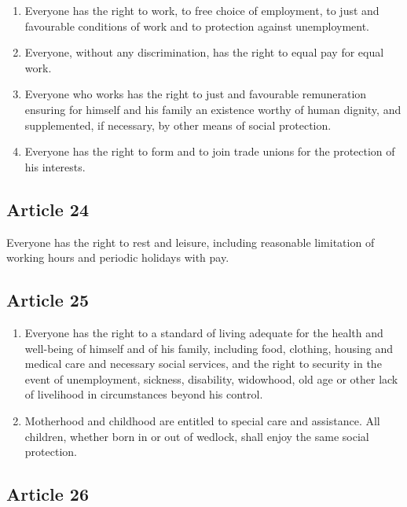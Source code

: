 \documentclass[
  ngerman,
  american,
  titlepage,
  openright,
  DIV=calc,
  toc=listof,
  listof=nochaptergap]{scrbook}
\begin{document}
\begin{enumerate}
\def\labelenumi{\arabic{enumi}.}
\item
  Everyone has the right to work, to free choice of employment, to just
  and favourable conditions of work and to protection against
  unemployment.
\item
  Everyone, without any discrimination, has the right to equal pay for
  equal work.
\item
  Everyone who works has the right to just and favourable remuneration
  ensuring for himself and his family an existence worthy of human
  dignity, and supplemented, if necessary, by other means of social
  protection.
\item
  Everyone has the right to form and to join trade unions for the
  protection of his interests.
\end{enumerate}

\subsection{Article 24}\label{article-24-4}

Everyone has the right to rest and leisure, including reasonable
limitation of working hours and periodic holidays with pay.

\subsection{Article 25}\label{article-25-4}

\begin{enumerate}
\def\labelenumi{\arabic{enumi}.}
\item
  Everyone has the right to a standard of living adequate for the health
  and well-being of himself and of his family, including food, clothing,
  housing and medical care and necessary social services, and the right
  to security in the event of unemployment, sickness, disability,
  widowhood, old age or other lack of livelihood in circumstances beyond
  his control.
\item
  Motherhood and childhood are entitled to special care and assistance.
  All children, whether born in or out of wedlock, shall enjoy the same
  social protection.
\end{enumerate}

\subsection{Article 26}\label{article-26-4}
\end{document}
